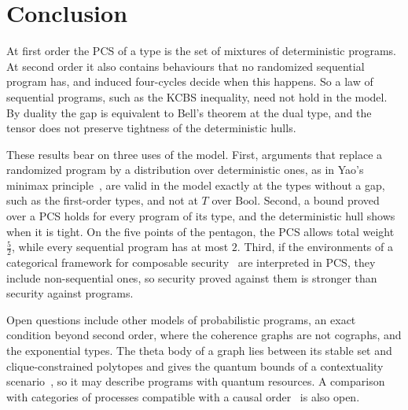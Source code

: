 \section{Conclusion}
\label{sec:conclusion}

At first order the PCS of a type is the set of mixtures of
deterministic programs. At second order it also contains behaviours that
no randomized sequential program has, and induced four-cycles decide when
this happens. So a law of sequential programs, such as the KCBS
inequality, need not hold in the model. By duality the gap is equivalent
to Bell's theorem at the dual type, and the tensor does not preserve
tightness of the deterministic hulls.

These results bear on three uses of the model. First, arguments that
replace a randomized program by a distribution over deterministic ones, as
in Yao's minimax principle~\cite{yao1977}, are valid in the model exactly
at the types without a gap, such as the first-order types, and not at $T$ over $\mathrm{Bool}$. Second, a bound proved over a PCS holds for every program
of its type, and the deterministic hull shows when it is tight. On the
five points of the pentagon, the PCS allows total weight
$\tfrac52$, while every sequential program has at most $2$. Third, if the
environments of a categorical framework for composable
security~\cite{broadbent-karvonen2022} are interpreted in
PCS, they include non-sequential ones, so security proved against them
is stronger than security against programs.

Open questions include other models of probabilistic programs, an exact
condition beyond second order, where the coherence graphs are not
cographs, and the exponential types. The theta body of a graph lies
between its stable set and clique-constrained polytopes and gives the
quantum bounds of a contextuality scenario~\cite{cabello2014}, so it may
describe programs with quantum resources. A comparison with categories of
processes compatible with a causal order~\cite{kissinger-uijlen2019} is
also open.
